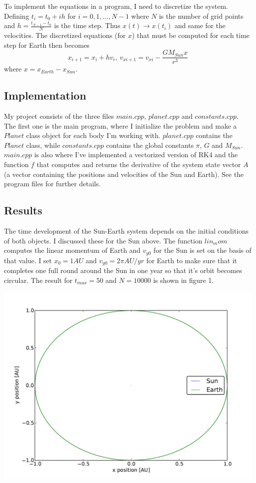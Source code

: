 \documentclass[a4paper,12pt, english]{article}
\begin{document}
To implement the equations in a program, I need to discretize the system. Defining $t_i = t_0 + ih$ for $i = 0, 1, \dots , N-1$ where $N$ is the number of grid points and 
$h = \frac{t_{N-1} - t_0}{N}$ is the time step. Thus $x(t) \rightarrow x(t_i)$ and same for the velocities. The discretized equations (for $x$) that must be computed for each time step for Earth then becomes
\[
x_{i+1} = x_i + hv_i, \ v_{xi+1} = v_{xi} - \frac{GM_{Sun}x}{r^3}
\]
where $x = x_{Earth} - x_{Sun}$. 

\subsection*{Implementation}
My project consists of the three files $main.cpp$, $planet.cpp$ and $constants.cpp$. The first one is the main program, where I initialize the problem and make a $Planet$ class object for each body I'm working with. $planet.cpp$ contains the $Planet$ class, while $constants.cpp$ contains the global constants $\pi$, $G$ and $M_{Sun}$. $main.cpp$ is also where I've implemented a vectorized version of RK4 and the function $f$ that computes and returns the derivative of the system state vector $A$ (a vector containing the positions and velocities of the Sun and Earth). See the program files for further details.

\subsection*{Results}
The time development of the Sun-Earth system depends on the initial conditions of both objects. I discussed these for the Sun above. The function $lin_mom$ computes the linear momentum of Earth and $v_{y0}$ for the Sun is set on the basis of that value. I set $x_0 = 1 AU$ and 
$v_{y0} = 2\pi AU/yr$ for Earth to make sure that it completes one full round around the Sun in one year so that it's orbit becomes circular. The result for $t_{max} = 50$ and $N = 10000$ is shown in figure 1.

\includegraphics[scale = 0.5]{Fig1.pdf}
\end{document}
